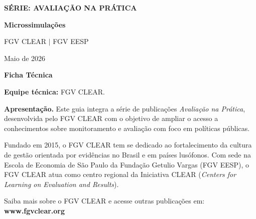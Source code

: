 \documentclass[12pt, a4paper, openany]{book}
\numberwithin{equation}{chapter}
\numberwithin{table}{chapter}
\numberwithin{figure}{chapter}
\theoremstyle{break}
\begin{document}
\frontmatter

\thispagestyle{empty}
\begin{center}
\vspace*{3cm}

{\Large\bfseries\color{clearlightblue} S\'ERIE: AVALIA\c{C}\~AO NA PR\'ATICA}

\vspace{1.8cm}

{\Huge\bfseries\color{clearblue} Microssimula\c{c}\~oes }

\vspace{2.2cm}

{\large FGV CLEAR $|$ FGV EESP}

\vspace{0.5cm}

{\large Maio de 2026}

\vfill
\end{center}
\newpage

\thispagestyle{empty}
\vspace*{1.5cm}

{\Large\bfseries\color{clearblue} Ficha T\'ecnica}

\bigskip

\noindent\textbf{Equipe t\'ecnica:} FGV CLEAR.

\bigskip

\noindent\textbf{Apresenta\c{c}\~ao.} Este guia integra a s\'erie de publica\c{c}\~oes \textit{Avalia\c{c}\~ao na Pr\'atica}, desenvolvida pelo FGV CLEAR com o objetivo de ampliar o acesso a conhecimentos sobre monitoramento e avalia\c{c}\~ao com foco em pol\'iticas p\'ublicas.

\medskip

\noindent Fundado em 2015, o FGV CLEAR tem se dedicado ao fortalecimento da cultura de gest\~ao orientada por evid\^encias no Brasil e em pa\'ises lus\'ofonos. Com sede na Escola de Economia de S\~ao Paulo da Funda\c{c}\~ao Getulio Vargas (FGV EESP), o FGV CLEAR atua como centro regional da Iniciativa CLEAR (\textit{Centers for Learning on Evaluation and Results}).

\medskip

\noindent Saiba mais sobre o FGV CLEAR e acesse outras publica\c{c}\~oes em: \textbf{www.fgvclear.org}
\end{document}
